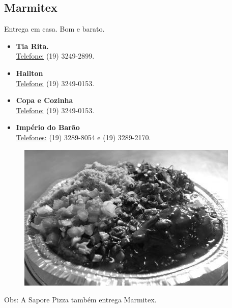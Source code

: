 \subsection{Marmitex}

Entrega em casa. Bom e barato.

\begin{itemize}
\item  \textbf{Tia Rita.}
\\\underline{Telefone:} (19) 3249-2899.

\item  \textbf{Hailton}
\\\underline{Telefone:} (19) 3249-0153.

\item  \textbf{Copa e Cozinha}
\\\underline{Telefone:} (19) 3249-0153.

\item  \textbf{Império do Barão}
\\\underline{Telefones:} (19) 3289-8054 e (19) 3289-2170.
\end{itemize}

\begin{figure}[t!]
    \centering
    \includegraphics[scale=0.55,keepaspectratio=true]{img/imgs/6-comida/marmitex.jpg}
\end{figure}

Obs: A Sapore Pizza também entrega Marmitex.


